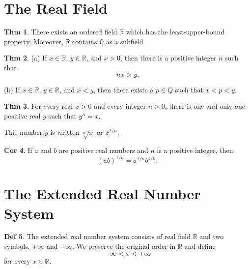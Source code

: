\documentclass{article}
\theoremstyle{definition}
\newtheorem{definition}{Def}
\newtheorem{theorem}[definition]{Thm}
\newtheorem{corollary}[definition]{Cor}
\begin{document}
\section{The Real Field}
\begin{theorem}
    There exists an ordered field $\mathbb{R}$ which has the least-upper-bound property. Moreover, $\mathbb{R}$ contains $\mathbb{Q}$ as a subfield.
\end{theorem}
\begin{theorem}
    \leavevmode\par
    (a) If $x\in \mathbb{R}$, $y\in \mathbb{R}$, and $x>0$, then there is a positive integer $n$ such that
    \[
    nx > y.
    \]\par
    (b) If $x\in \mathbb{R}$, $y\in\mathbb{R}$, and $x<y$, then there exists a $p \in Q$ such that $x<p<y$.
\end{theorem}
\begin{theorem}
    For every real $x>0$ and every integer $n>0$, there is one and only one positive real $y$ such that $y^n=x$.\par
    This number $y$ is written $\sqrt[n]{x}$ or $x^{1/n}$.
\end{theorem}
\begin{corollary}
    If $a$ and $b$ are positive real numbers and $n$ is a positive integer, then
    \[
    (ab)^{1/n}=a^{1/n}b^{1/n}.
    \]
\end{corollary}

\section{The Extended Real Number System}
\begin{definition}
    The extended real number system consists of real field $\mathbb{R}$ and two symbols, $+\infty$ and $-\infty$. We preserve the original order in $\mathbb{R}$ and define
    \[
    -\infty<x<+\infty
    \]
    for every $x\in\mathbb{R}$.
\end{definition}
\end{document}
